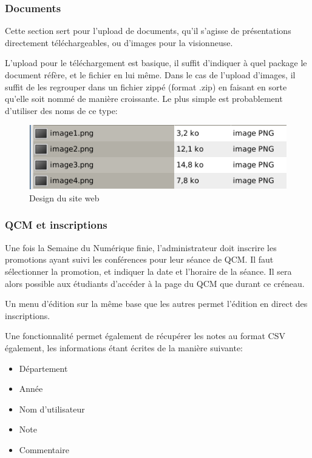             \subsubsection{Documents}

Cette section sert pour l'upload de documents, qu'il s'agisse de présentations directement téléchargeables, ou d'images pour la visionneuse.

L'upload pour le téléchargement est basique, il suffit d'indiquer à quel package le document réfère, et le fichier en lui même.
Dans le cas de l'upload d'images, il suffit de les regrouper dans un fichier zippé (format .zip) en faisant en sorte qu'elle soit
nommé de manière croissante. Le plus simple est probablement d'utiliser des noms de ce type:

    \begin{figure}[h]
        \begin{center}
        \includegraphics[scale=0.4]{images/screenshotImages.png} 
        \end{center}
        \caption{Design du site web}
        \label{Design du site web}
    \end{figure}

            \subsubsection{QCM et inscriptions}

Une fois la Semaine du Numérique finie, l'administrateur doit inscrire les promotions ayant suivi les conférences pour leur
séance de QCM. Il faut sélectionner la promotion, et indiquer la date et l'horaire de la séance. Il sera alors possible aux étudiants d'accéder à la page du QCM que durant ce créneau.

Un menu d'édition sur la même base que les autres permet l'édition en direct des inscriptions.

Une fonctionnalité permet également de récupérer les notes au format CSV également, les informations étant écrites de la manière suivante:

    \begin{itemize}
    \item Département
    \item Année
    \item Nom d'utilisateur
    \item Note
    \item Commentaire
    \end{itemize}

